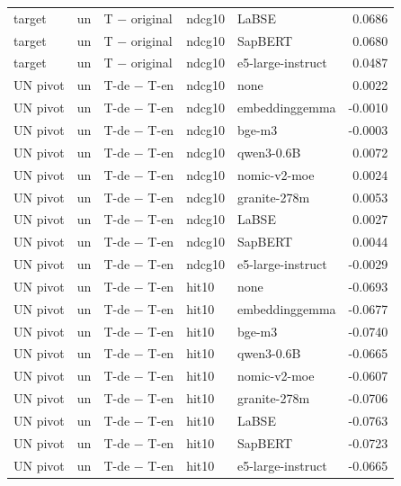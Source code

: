 \begin{tabular}{lllllr}
target & un & T − original & ndcg10 & LaBSE & 0.0686 \\
target & un & T − original & ndcg10 & SapBERT & 0.0680 \\
target & un & T − original & ndcg10 & e5-large-instruct & 0.0487 \\
UN pivot & un & T-de − T-en & ndcg10 & none & 0.0022 \\
UN pivot & un & T-de − T-en & ndcg10 & embeddinggemma & -0.0010 \\
UN pivot & un & T-de − T-en & ndcg10 & bge-m3 & -0.0003 \\
UN pivot & un & T-de − T-en & ndcg10 & qwen3-0.6B & 0.0072 \\
UN pivot & un & T-de − T-en & ndcg10 & nomic-v2-moe & 0.0024 \\
UN pivot & un & T-de − T-en & ndcg10 & granite-278m & 0.0053 \\
UN pivot & un & T-de − T-en & ndcg10 & LaBSE & 0.0027 \\
UN pivot & un & T-de − T-en & ndcg10 & SapBERT & 0.0044 \\
UN pivot & un & T-de − T-en & ndcg10 & e5-large-instruct & -0.0029 \\
UN pivot & un & T-de − T-en & hit10 & none & -0.0693 \\
UN pivot & un & T-de − T-en & hit10 & embeddinggemma & -0.0677 \\
UN pivot & un & T-de − T-en & hit10 & bge-m3 & -0.0740 \\
UN pivot & un & T-de − T-en & hit10 & qwen3-0.6B & -0.0665 \\
UN pivot & un & T-de − T-en & hit10 & nomic-v2-moe & -0.0607 \\
UN pivot & un & T-de − T-en & hit10 & granite-278m & -0.0706 \\
UN pivot & un & T-de − T-en & hit10 & LaBSE & -0.0763 \\
UN pivot & un & T-de − T-en & hit10 & SapBERT & -0.0723 \\
UN pivot & un & T-de − T-en & hit10 & e5-large-instruct & -0.0665 \\
\bottomrule
\end{tabular}
